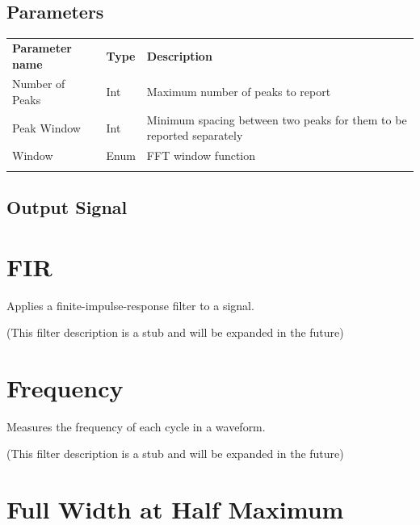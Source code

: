 \subsection{Parameters}

\begin{tabularx}{16cm}{llX}
\thickhline
\textbf{Parameter name} & \textbf{Type} & \textbf{Description} \\
\thickhline
Number of Peaks & Int & Maximum number of peaks to report\\
\thinhline
Peak Window & Int & Minimum spacing between two peaks for them to be reported separately\\
\thinhline
Window & Enum & FFT window function\\
\thickhline
\end{tabularx}

\subsection{Output Signal}

\pagebreak
\section{FIR}

Applies a finite-impulse-response filter to a signal.

(This filter description is a stub and will be expanded in the future)

\pagebreak
\section{Frequency}
\label{filter:frequency}

Measures the frequency of each cycle in a waveform.

(This filter description is a stub and will be expanded in the future)

\pagebreak
\section{Full Width at Half Maximum}
\label{filter:FullWidthHalfMaximum}

